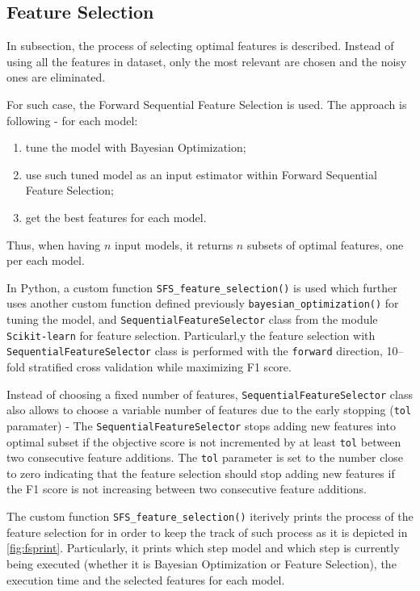\subsection{Feature Selection}
\label{subsec:feature-selection}

In subsection, the process of selecting optimal features is described. Instead of using all the features in dataset, only the most relevant are chosen and the noisy ones are eliminated.

For such case, the Forward Sequential Feature Selection is used. The approach is following - for each model:

\begin{enumerate}\setlength\itemsep{0em}
    \item tune the model with Bayesian Optimization;
    \item use such tuned model as an input estimator within Forward Sequential Feature Selection;
    \item get the best features for each model.
\end{enumerate}

Thus, when having $n$ input models, it returns $n$  subsets of optimal features, one per each model.

In Python, a custom function \lstinline{SFS_feature_selection()} is used which further uses another custom function defined previously \lstinline{bayesian_optimization()} for tuning the model, and \lstinline{SequentialFeatureSelector} class from the module \lstinline{Scikit-learn} for feature selection.
Particularl,y the feature selection with \lstinline{SequentialFeatureSelector} class is performed with the \texttt{forward} direction, 10--fold stratified cross validation while maximizing F1 score.



Instead of choosing a fixed number of features, \lstinline{SequentialFeatureSelector} class also allows to choose a variable number of features due to the early stopping (\texttt{tol} paramater) - The \lstinline{SequentialFeatureSelector} stops adding new features into optimal subset if the objective score is not incremented by at least \texttt{tol} between two consecutive feature additions\citep{scikit-learn-sequential-feature-selector}.
The \texttt{tol} parameter is set to the number close to zero indicating that the feature selection should stop adding new features if the F1 score is not increasing between two consecutive feature additions.

The custom function \lstinline{SFS_feature_selection()} iterively prints the process of the feature selection for in order to keep the track of such process as it is depicted in \autoref{fig:fsprint}.
Particularly, it prints which step model and which step is currently being executed (whether it is Bayesian Optimization or Feature Selection), the execution time and the selected features for each model.

